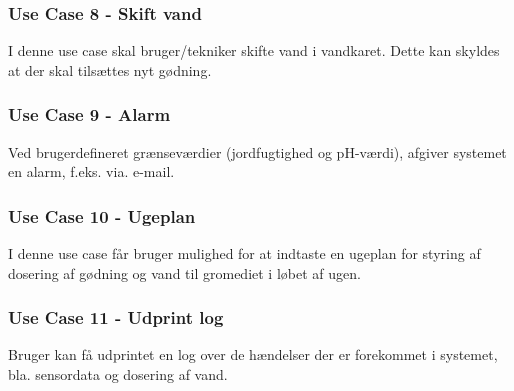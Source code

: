 \subsubsection{Use Case 8 - Skift vand}
I denne use case skal bruger/tekniker skifte vand i vandkaret. Dette kan skyldes at der skal tilsættes nyt gødning.

\subsubsection{Use Case 9 - Alarm}
Ved brugerdefineret grænseværdier (jordfugtighed og pH-værdi), afgiver systemet en alarm, f.eks. via. e-mail. 

\subsubsection{Use Case 10 - Ugeplan}
I denne use case får bruger mulighed for at indtaste en ugeplan for styring af dosering af gødning og vand til gromediet i løbet af ugen. 

\subsubsection{Use Case 11 - Udprint log}
Bruger kan få udprintet en log over de hændelser der er forekommet i systemet, bla. sensordata og dosering af vand.